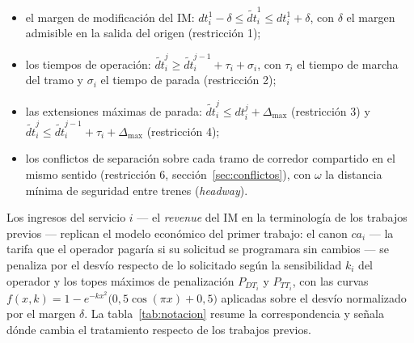 \documentclass[11pt,a4paper]{article}
\begin{document}
\begin{itemize}
\item el margen de modificación del IM: $dt_i^1 - \delta \le \tilde{dt}_i^1
\le dt_i^1 + \delta$, con $\delta$ el margen admisible en la salida del
origen (restricción 1);
\item los tiempos de operación: $\tilde{dt}_i^j \ge \tilde{dt}_i^{j-1} +
\tau_i + \sigma_i$, con $\tau_i$ el tiempo de marcha del tramo y $\sigma_i$
el tiempo de parada (restricción 2);
\item las extensiones máximas de parada: $\tilde{dt}_i^j \le dt_i^j +
\Delta_{\max}$ (restricción 3) y $\tilde{dt}_i^j \le \tilde{dt}_i^{j-1} +
\tau_i + \Delta_{\max}$ (restricción 4);
\item los conflictos de separación sobre cada tramo de corredor compartido
en el mismo sentido (restricción 6, sección~\ref{sec:conflictos}), con
$\omega$ la distancia mínima de seguridad entre trenes (\emph{headway}).
\end{itemize}

Los ingresos del servicio $i$ --- el \emph{revenue} del IM en la
terminología de los trabajos previos --- replican el modelo económico del
primer trabajo: el canon $ca_i$ --- la tarifa que el operador pagaría si su
solicitud se programara sin cambios --- se penaliza por el desvío respecto
de lo solicitado según la sensibilidad $k_i$ del operador y los topes
máximos de penalización $P_{DT_i}$ y $P_{TT_i}$, con las curvas
$f(x,k) = 1 - e^{-kx^2}\big(0{,}5\cos(\pi x) + 0{,}5\big)$ aplicadas sobre
el desvío normalizado por el margen $\delta$. La
tabla~\ref{tab:notacion} resume la correspondencia y señala dónde cambia el
tratamiento respecto de los trabajos previos.
\end{document}
